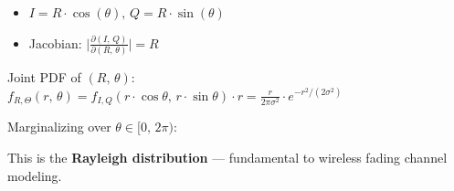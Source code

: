 \begin{itemize}
\tightlist
\item
  $I = R \cdot \cos (\theta),\, Q = R \cdot \sin (\theta)$
\item
  Jacobian: $\lvert \frac{\partial (I,\,Q)}{\partial (R,\,\theta)}\rvert = R$
\end{itemize}

Joint PDF of $(R,\, \theta)$:\PSbr{}$\displaystyle f_{R,\Theta}(r,\,\theta) = f_{I,Q}(r \cdot \cos \theta,\, r \cdot \sin \theta) \cdot r = \frac{r}{2\pi \sigma^{2}} \cdot e^{-r^{2}/(2\sigma^{2})}$

Marginalizing over $\theta \in [0,\, 2\pi)$:


This is the \textbf{Rayleigh distribution} — fundamental to wireless fading channel modeling.


